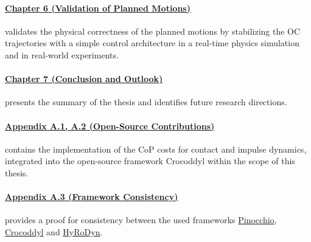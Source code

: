 \paragraph{\hyperref[c6]{Chapter 6 (Validation of Planned Motions)}} validates the physical correctness of the planned motions by stabilizing the \gls{OC} trajectories with a simple control architecture in a real-time physics simulation and in real-world experiments.
\paragraph{\hyperref[c7]{Chapter 7 (Conclusion and Outlook)}} presents the summary of the thesis and identifies future research directions. 
\paragraph{\hyperref[app:ContactCoP]{Appendix A.1, A.2 (Open-Source Contributions)}} contains the implementation of the \gls{CoP} costs for contact and impulse dynamics, integrated into the open-source framework Crocoddyl within the scope of this thesis. 
\paragraph{\hyperref[app:Consistency]{Appendix A.3 (Framework Consistency)}} provides a proof for consistency between the used frameworks \href{https://github.com/stack-of-tasks/pinocchio}{Pinocchio}, \href{https://github.com/loco-3d/crocoddyl#contact-robot-control-by-differential-dynamic-programming-library-crocoddyl}{Crocoddyl} and \href{https://robotik.dfki-bremen.de/en/research/softwaretools/hyrodyn/}{HyRoDyn}. 





















